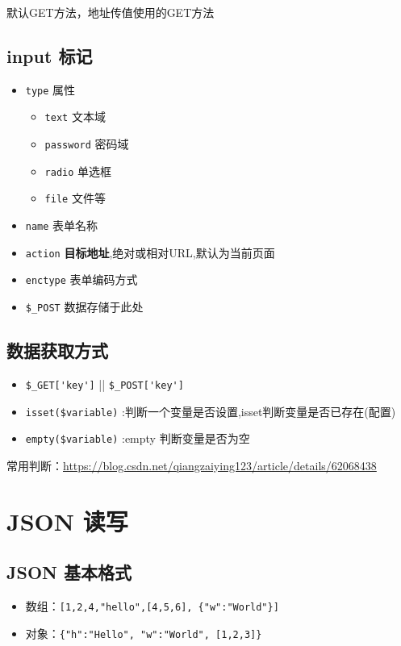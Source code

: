 \documentclass[UTF8,a4paper,12pt]{ctexbook}
\begin{document}
			默认GET方法，地址传值使用的GET方法
			
		\subsection{input 标记}
			\begin{itemize}
				\item \verb|type| 属性
					\begin{itemize}
						\item \verb|text| 文本域
						\item \verb|password| 密码域
						\item \verb|radio| 单选框
						\item \verb|file| 文件等
					\end{itemize}
				\item \verb|name| 表单名称
				\item \verb|action| \textbf{目标地址},绝对或相对URL,默认为当前页面
				\item \verb|enctype| 表单编码方式
				\item \verb|$_POST| 数据存储于此处
			\end{itemize}
		
		\subsection{数据获取方式}
			\begin{itemize}
				\item \verb|$_GET['key']| || \verb|$_POST['key']|
				\item \verb|isset($variable)| :判断一个变量是否设置,isset判断变量是否已存在(配置)
				\item \verb|empty($variable)| :empty 判断变量是否为空
			\end{itemize}
			
			常用判断：\url{https://blog.csdn.net/qiangzaiying123/article/details/62068438}
	
	\section{JSON 读写}
		\subsection{JSON 基本格式}
			\begin{itemize}
				\item 数组：\verb|[1,2,4,"hello",[4,5,6], {"w":"World"}]|
				\item 对象：\verb|{"h":"Hello", "w":"World", [1,2,3]}|
			\end{itemize}
		
\end{document}
